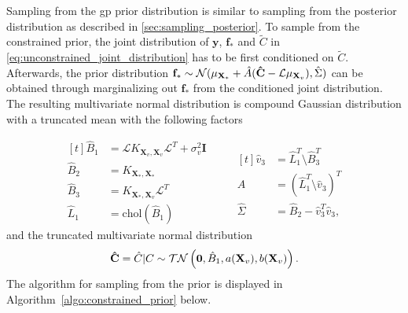 Sampling from the \gls{gp} prior distribution is similar to sampling from the posterior distribution as described in \cref{sec:sampling_posterior}. To sample from the constrained prior, the joint distribution of $\mathbf{y}$, $\mathbf{f_*}$ and $\tilde{C}$ in \eqref{eq:unconstrained_joint_distribution} has to be first conditioned on $\tilde{C}$. Afterwards, the prior distribution $\mathbf{f_*} \sim \mathcal{N}(\mu_{\mathbf{X}_*} + \hat{A} (\mathrm{\mathbf{\hat{C}}} - \mathcal{L}\mu_{\mathbf{X}_v}), \hat{\Sigma})$ can be obtained through marginalizing out $\mathbf{f_*}$ from the conditioned joint distribution. The resulting multivariate normal distribution is compound Gaussian distribution with a truncated mean with the following factors

\begin{equation}
    \begin{aligned}[t]
    \hat{B}_1 &= \mathcal{L}K_{\mathbf{X}_v,\mathbf{X}_v}\mathcal{L}^T + \sigma_v^2\mathbf{I}\\
    \hat{B}_2 &= K_{ \mathbf{X}_*, \mathbf{X}_*} \\
    \hat{B}_3 &= K_{ \mathbf{X}_*,\mathbf{X}_v}\mathcal{L}^T \\
    \hat{L}_1 &= \mathrm{chol}(\hat{B}_1)
\end{aligned}
\qquad 
\begin{aligned}[t]
    \hat{v}_3 &= \hat{L}_1^T \setminus \hat{B}_3^T \\
    \hat{A} &= \left(\hat{L}_1^T \setminus \hat{v}_3\right)^T \\
    \hat{\Sigma} &= \hat{B}_2 - \hat{v}_3^T \hat{v}_3,
\end{aligned}
\end{equation}
and the truncated multivariate normal distribution
\begin{equation}
    \mathrm{\mathbf{\hat{C}}}=\hat{C} | C \sim \mathcal{TN}\left(\mathbf{0}, \hat{B}_1, a( \mathbf{X}_v), b( \mathbf{X}_v) \right).
    \label{eq:constrained_prior}
\end{equation}
The algorithm for sampling from the prior is displayed in Algorithm~\ref{algo:constrained_prior} below.

